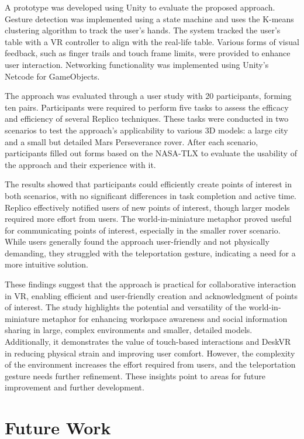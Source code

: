     A prototype was developed using Unity to evaluate the proposed approach. Gesture detection was implemented using a state machine and uses the K-means clustering algorithm to track the user's hands. The system tracked the user's table with a VR controller to align with the real-life table. Various forms of visual feedback, such as finger trails and touch frame limits, were provided to enhance user interaction. Networking functionality was implemented using Unity's Netcode for GameObjects.

    The approach was evaluated through a user study with 20 participants, forming ten pairs. Participants were required to perform five tasks to assess the efficacy and efficiency of several Replico techniques. These tasks were conducted in two scenarios to test the approach's applicability to various 3D models: a large city and a small but detailed Mars Perseverance rover. After each scenario, participants filled out forms based on the NASA-TLX to evaluate the usability of the approach and their experience with it.

    The results showed that participants could efficiently create points of interest in both scenarios, with no significant differences in task completion and active time. Replico effectively notified users of new points of interest, though larger models required more effort from users. The world-in-miniature metaphor proved useful for communicating points of interest, especially in the smaller rover scenario. While users generally found the approach user-friendly and not physically demanding, they struggled with the teleportation gesture, indicating a need for a more intuitive solution.

    These findings suggest that the approach is practical for collaborative interaction in VR, enabling efficient and user-friendly creation and acknowledgment of points of interest. The study highlights the potential and versatility of the world-in-miniature metaphor for enhancing workspace awareness and social information sharing in large, complex environments and smaller, detailed models. Additionally, it demonstrates the value of touch-based interactions and DeskVR in reducing physical strain and improving user comfort. However, the complexity of the environment increases the effort required from users, and the teleportation gesture needs further refinement. These insights point to areas for future improvement and further development.

\section{Future Work}

